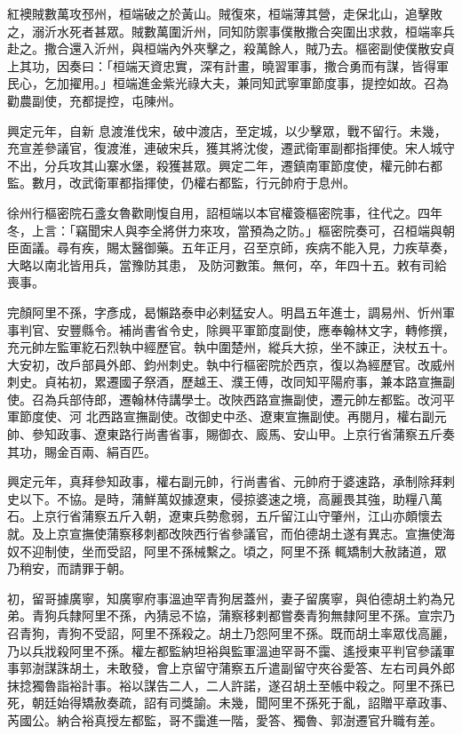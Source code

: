 \begin{pinyinscope}
 紅襖賊數萬攻邳州，桓端破之於黃山。賊復來，桓端薄其營，走保北山，追擊敗之，溺沂水死者甚眾。賊數萬圍沂州，同知防禦事僕散撒合突圍出求救，桓端率兵赴之。撒合還入沂州，與桓端內外夾擊之，殺萬餘人，賊乃去。樞密副使僕散安貞上其功，因奏曰：「桓端天資忠實，深有計畫，曉習軍事，撒合勇而有謀，皆得軍民心，乞加擢用。」桓端進金紫光祿大夫，兼同知武寧軍節度事，提控如故。召為勸農副使，充都提控，屯陳州。



 興定元年，自新
 息渡淮伐宋，破中渡店，至定城，以少擊眾，戰不留行。未幾，充宣差參議官，復渡淮，連破宋兵，獲其將沈俊，遷武衛軍副都指揮使。宋人城守不出，分兵攻其山寨水堡，殺獲甚眾。興定二年，遷鎮南軍節度使，權元帥右都監。數月，改武衛軍都指揮使，仍權右都監，行元帥府于息州。



 徐州行樞密院石盞女魯歡剛愎自用，詔桓端以本官權簽樞密院事，往代之。四年冬，上言：「竊聞宋人與李全將併力來攻，當預為之防。」樞密院奏可，召桓端與朝臣面議。尋有疾，賜太醫御藥。五年正月，召至京師，疾病不能入見，力疾草奏，大略以南北皆用兵，當豫防其患，
 及防河數策。無何，卒，年四十五。敕有司給喪事。



 完顏阿里不孫，字彥成，曷懶路泰申必剌猛安人。明昌五年進士，調易州、忻州軍事判官、安豐縣令。補尚書省令史，除興平軍節度副使，應奉翰林文字，轉修撰，充元帥左監軍紇石烈執中經歷官。執中圍楚州，縱兵大掠，坐不諫正，決杖五十。大安初，改戶部員外郎、鈞州刺史。執中行樞密院於西京，復以為經歷官。改威州刺史。貞祐初，累遷國子祭酒，歷越王、濮王傅，改同知平陽府事，兼本路宣撫副使。召為兵部侍郎，遷翰林侍講學士。改陜西路宣撫副使，遷元帥左都監。改河平軍節度使、河
 北西路宣撫副使。改御史中丞、遼東宣撫副使。再閱月，權右副元帥、參知政事、遼東路行尚書省事，賜御衣、廄馬、安山甲。上京行省蒲察五斤奏其功，賜金百兩、絹百匹。



 興定元年，真拜參知政事，權右副元帥，行尚書省、元帥府于婆速路，承制除拜剌史以下。不協。是時，蒲鮮萬奴據遼東，侵掠婆速之境，高麗畏其強，助糧八萬石。上京行省蒲察五斤入朝，遼東兵勢愈弱，五斤留江山守肇州，江山亦頗懷去就。及上京宣撫使蒲察移刺都改陜西行省參議官，而伯德胡土遂有異志。宣撫使海奴不迎制使，坐而受詔，阿里不孫械繫之。頃之，阿里不孫
 輒矯制大赦諸道，眾乃稍安，而請罪于朝。



 初，留哥據廣寧，知廣寧府事溫迪罕青狗居蓋州，妻子留廣寧，與伯德胡土約為兄弟。青狗兵隸阿里不孫，內猜忌不協，蒲察移剌都嘗奏青狗無隸阿里不孫。宣宗乃召青狗，青狗不受詔，阿里不孫殺之。胡土乃怨阿里不孫。既而胡土率眾伐高麗，乃以兵戕殺阿里不孫。權左都監納坦裕與監軍溫迪罕哥不靄、遙授東平判官參議軍事郭澍謀誅胡土，未敢發，會上京留守蒲察五斤遣副留守夾谷愛答、左右司員外郎抹捻獨魯詣裕計事。裕以謀告二人，二人許諾，遂召胡土至帳中殺之。阿里不孫已
 死，朝廷始得矯赦奏疏，詔有司獎諭。未幾，聞阿里不孫死于亂，詔贈平章政事、芮國公。納合裕真授左都監，哥不靄進一階，愛答、獨魯、郭澍遷官升職有差。




\end{pinyinscope}
